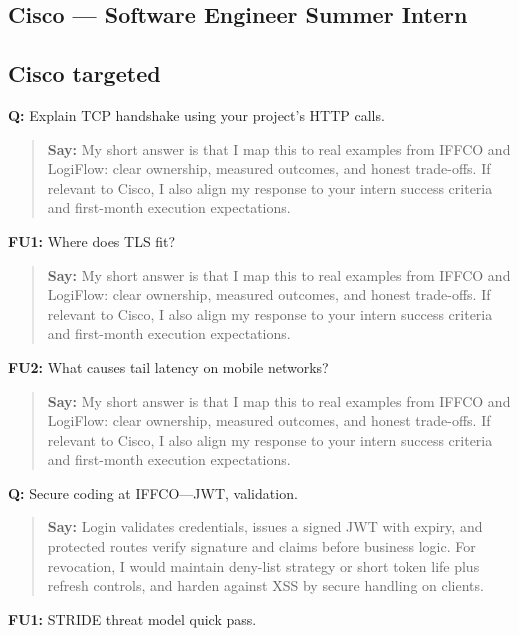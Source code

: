 \documentclass[9pt,a4paper]{article}
\begin{document}
\subsection{Cisco --- Software Engineer Summer Intern}
\subsection{Cisco targeted}
\textbf{Q:} Explain TCP handshake using your project's HTTP calls.

\begin{quote}\small\textbf{Say:} My short answer is that I map this to real examples from IFFCO and LogiFlow: clear ownership, measured outcomes, and honest trade-offs. If relevant to Cisco, I also align my response to your intern success criteria and first-month execution expectations.\end{quote}
\vspace{2mm}
\textbf{FU1:} Where does TLS fit?

\begin{quote}\small\textbf{Say:} My short answer is that I map this to real examples from IFFCO and LogiFlow: clear ownership, measured outcomes, and honest trade-offs. If relevant to Cisco, I also align my response to your intern success criteria and first-month execution expectations.\end{quote}
\vspace{2mm}
\textbf{FU2:} What causes tail latency on mobile networks?

\begin{quote}\small\textbf{Say:} My short answer is that I map this to real examples from IFFCO and LogiFlow: clear ownership, measured outcomes, and honest trade-offs. If relevant to Cisco, I also align my response to your intern success criteria and first-month execution expectations.\end{quote}
\vspace{2mm}
\textbf{Q:} Secure coding at IFFCO---JWT, validation.

\begin{quote}\small\textbf{Say:} Login validates credentials, issues a signed JWT with expiry, and protected routes verify signature and claims before business logic. For revocation, I would maintain deny-list strategy or short token life plus refresh controls, and harden against XSS by secure handling on clients.\end{quote}
\vspace{2mm}
\textbf{FU1:} STRIDE threat model quick pass.
\end{document}
